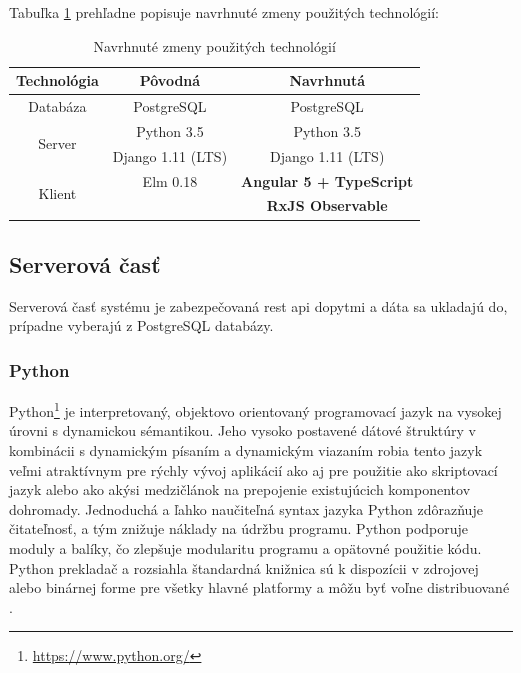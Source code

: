 Tabuľka \ref{table:1} prehľadne popisuje navrhnuté zmeny použitých technológií:
 
\begin{table}[h!]
\centering
\begin{tabular}{| c || c | c |} 
 \hline
Technológia & Pôvodná & Navrhnutá \\ [0.5ex] 
\hline\hline
Databáza & PostgreSQL & PostgreSQL \\ 
\hline
\multirow{2}{4em}{Server} & Python 3.5 & Python 3.5 \\ 
				  & Django 1.11 (LTS) & Django 1.11 (LTS) \\ 
\hline
\multirow{2}{4em}{Klient} & Elm 0.18 & \textbf{Angular 5 + TypeScript} \\ 
				& &  \textbf{RxJS Observable} \\ 
\hline
\end{tabular}
\caption{Navrhnuté zmeny použitých technológií}
\label{table:1}
\end{table}

\subsection{Serverová časť}
\label{subsec:back_end}

Serverová časť systému je zabezpečovaná \acrshort{rest} \acrshort{api} dopytmi
a dáta sa ukladajú do, prípadne vyberajú z PostgreSQL databázy.

\subsubsection{Python}
\label{subsubsec:python}

Python\footnote{\url{https://www.python.org/}} je interpretovaný, objektovo
orientovaný programovací jazyk na vysokej úrovni s dynamickou sémantikou.
Jeho vysoko postavené dátové štruktúry v kombinácii s dynamickým písaním
a dynamickým viazaním robia tento jazyk veľmi atraktívnym pre rýchly vývoj aplikácií
ako aj pre použitie ako skriptovací jazyk alebo ako akýsi medzičlánok na
prepojenie existujúcich komponentov dohromady. Jednoduchá a ľahko naučiteľná
syntax jazyka Python zdôrazňuje čitateľnosť, a tým znižuje náklady na údržbu programu.
Python podporuje moduly a balíky, čo zlepšuje modularitu programu a opätovné
použitie kódu. Python prekladač a rozsiahla štandardná knižnica sú k dispozícii v
zdrojovej alebo binárnej forme pre všetky hlavné platformy a môžu byť voľne distribuované \cite{python_faq}.

